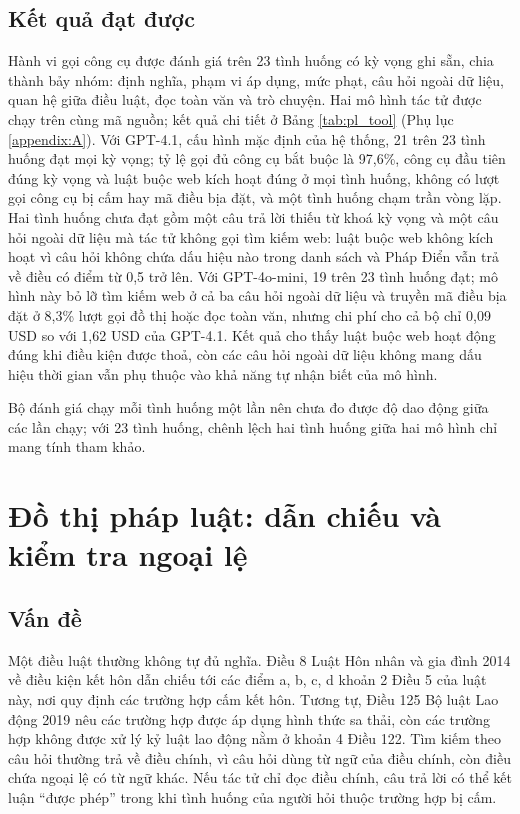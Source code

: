 \documentclass[../DoAn.tex]{subfiles}
\begin{document}
\subsection{Kết quả đạt được}
Hành vi gọi công cụ được đánh giá trên 23 tình huống có kỳ vọng ghi sẵn, chia thành bảy nhóm: định nghĩa, phạm vi áp dụng, mức phạt, câu hỏi ngoài dữ liệu, quan hệ giữa điều luật, đọc toàn văn và trò chuyện. Hai mô hình tác tử được chạy trên cùng mã nguồn; kết quả chi tiết ở Bảng \ref{tab:pl_tool} (Phụ lục \ref{appendix:A}). Với GPT-4.1, cấu hình mặc định của hệ thống, 21 trên 23 tình huống đạt mọi kỳ vọng; tỷ lệ gọi đủ công cụ bắt buộc là 97,6\%, công cụ đầu tiên đúng kỳ vọng và luật buộc web kích hoạt đúng ở mọi tình huống, không có lượt gọi công cụ bị cấm hay mã điều bịa đặt, và một tình huống chạm trần vòng lặp. Hai tình huống chưa đạt gồm một câu trả lời thiếu từ khoá kỳ vọng và một câu hỏi ngoài dữ liệu mà tác tử không gọi tìm kiếm web: luật buộc web không kích hoạt vì câu hỏi không chứa dấu hiệu nào trong danh sách và Pháp Điển vẫn trả về điều có điểm từ 0,5 trở lên. Với GPT-4o-mini, 19 trên 23 tình huống đạt; mô hình này bỏ lỡ tìm kiếm web ở cả ba câu hỏi ngoài dữ liệu và truyền mã điều bịa đặt ở 8,3\% lượt gọi đồ thị hoặc đọc toàn văn, nhưng chi phí cho cả bộ chỉ 0,09 USD so với 1,62 USD của GPT-4.1. Kết quả cho thấy luật buộc web hoạt động đúng khi điều kiện được thoả, còn các câu hỏi ngoài dữ liệu không mang dấu hiệu thời gian vẫn phụ thuộc vào khả năng tự nhận biết của mô hình.

Bộ đánh giá chạy mỗi tình huống một lần nên chưa đo được độ dao động giữa các lần chạy; với 23 tình huống, chênh lệch hai tình huống giữa hai mô hình chỉ mang tính tham khảo.

\section{Đồ thị pháp luật: dẫn chiếu và kiểm tra ngoại lệ}
\label{section:5.graph}

\subsection{Vấn đề}
Một điều luật thường không tự đủ nghĩa. Điều 8 Luật Hôn nhân và gia đình 2014 về điều kiện kết hôn dẫn chiếu tới các điểm a, b, c, d khoản 2 Điều 5 của luật này, nơi quy định các trường hợp cấm kết hôn. Tương tự, Điều 125 Bộ luật Lao động 2019 nêu các trường hợp được áp dụng hình thức sa thải, còn các trường hợp không được xử lý kỷ luật lao động nằm ở khoản 4 Điều 122. Tìm kiếm theo câu hỏi thường trả về điều chính, vì câu hỏi dùng từ ngữ của điều chính, còn điều chứa ngoại lệ có từ ngữ khác. Nếu tác tử chỉ đọc điều chính, câu trả lời có thể kết luận ``được phép'' trong khi tình huống của người hỏi thuộc trường hợp bị cấm.
\end{document}
